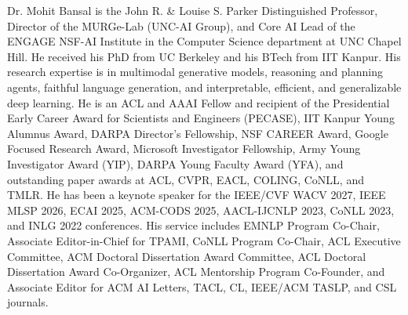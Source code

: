 Dr. Mohit Bansal is the John R. \& Louise S. Parker Distinguished Professor, Director of the MURGe-Lab (UNC-AI Group), and Core AI Lead of the ENGAGE NSF-AI Institute in the Computer Science department at UNC Chapel Hill. He received his PhD from UC Berkeley and his BTech from IIT Kanpur. His research expertise is in multimodal generative models, reasoning and planning agents, faithful language generation, and interpretable, efficient, and generalizable deep learning. He is an ACL and AAAI Fellow and recipient of the Presidential Early Career Award for Scientists and Engineers (PECASE), IIT Kanpur Young Alumnus Award, DARPA Director’s Fellowship, NSF CAREER Award, Google Focused Research Award, Microsoft Investigator Fellowship, Army Young Investigator Award (YIP), DARPA Young Faculty Award (YFA), and outstanding paper awards at ACL, CVPR, EACL, COLING, CoNLL, and TMLR. He has been a keynote speaker for the IEEE/CVF WACV 2027, IEEE MLSP 2026, ECAI 2025, ACM-CODS 2025, AACL-IJCNLP 2023, CoNLL 2023, and INLG 2022 conferences. His service includes EMNLP Program Co-Chair, Associate Editor-in-Chief for TPAMI, CoNLL Program Co-Chair, ACL Executive Committee, ACM Doctoral Dissertation Award Committee, ACL Doctoral Dissertation Award Co-Organizer, ACL Mentorship Program Co-Founder, and Associate Editor for ACM AI Letters, TACL, CL, IEEE/ACM TASLP, and CSL journals. 
